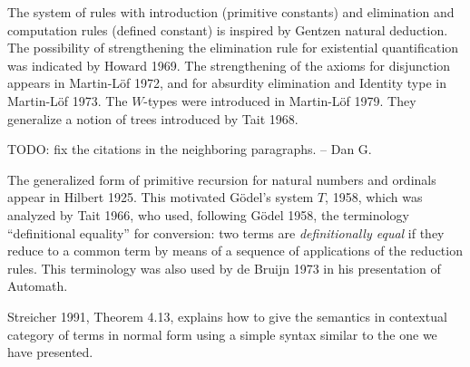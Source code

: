 {%

 The system of rules with introduction (primitive constants) and elimination and computation rules
(defined constant) is inspired by Gentzen natural deduction. The possibility of strengthening
the elimination rule for existential quantification was indicated by Howard 1969. The strengthening of
the axioms for disjunction appears in Martin-L\"of 1972, and for absurdity elimination and Identity type
in Martin-L\"of 1973. The $W$-types were introduced in Martin-L\"of 1979. They generalize a notion
of trees introduced by Tait 1968.%

TODO: fix the citations in the neighboring paragraphs. -- Dan G.

 The generalized form of primitive recursion for natural numbers and ordinals appear in Hilbert 1925.
This motivated G\"odel's system $T$, 1958, which was analyzed by Tait 1966, who used, following
G\"odel 1958, the terminology
``definitional equality'' for conversion: two terms are {\em definitionally equal} if they reduce
to a common term by means of a sequence of applications of the reduction rules. This terminology was
also used by de Bruijn 1973 in his presentation of Automath.

 Streicher 1991, Theorem 4.13, explains how to give the semantics in contextual category of terms in normal
form using a simple syntax similar to the one we have presented.

}
%  




